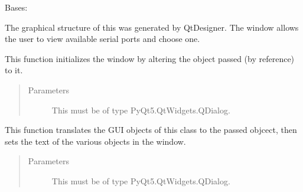 \documentclass[letterpaper,10pt,english]{sphinxmanual}
\begin{document}
\begin{fulllineitems}
\label{\detokenize{portsGUI:portsGUI.Ui_Dialog}}
Bases: 

The graphical structure of this  was generated by QtDesigner.
The window allows the user to view available serial ports and choose one.

\begin{fulllineitems}
\label{\detokenize{portsGUI:portsGUI.Ui_Dialog.setupUi}}
This function initializes the window by altering the  object passed (by reference) to it.
\begin{quote}\begin{description}
\item[{Parameters}] \leavevmode
{} \textendash{} This must be of type PyQt5.QtWidgets.QDialog.

\end{description}\end{quote}

\end{fulllineitems}


\begin{fulllineitems}
\label{\detokenize{portsGUI:portsGUI.Ui_Dialog.retranslateUi}}
This function translates the GUI objects of this class to the passed  objcect,
then sets the text of the various objects in the window.
\begin{quote}\begin{description}
\item[{Parameters}] \leavevmode
{} \textendash{} This must be of type PyQt5.QtWidgets.QDialog.

\end{description}\end{quote}


\end{fulllineitems}
\end{fulllineitems}
\end{document}
